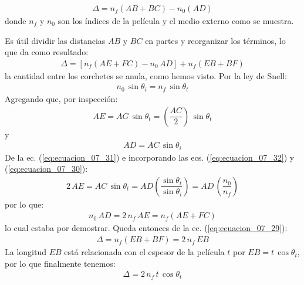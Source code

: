 \documentclass[14pt]{extarticle}
\begin{document}
\begin{align*}
\Delta = n_{f} (AB + BC) - n_{0} (AD)
\end{align*}
donde $n_{f}$ y $n_{0}$ son los índices de la película y el medio externo como se muestra.
\par
Es útil dividir las distancias $AB$ y $BC$ en partes y reorganizar los términos, lo que da como resultado:
\begin{align}
\Delta = \left[ n_{f} (AE + FC) - n_{0} \, AD\right] + n_{f} (EB + BF)
\label{eq:ecuacion_07_29}
\end{align}
la cantidad entre los corchetes se anula, como hemos visto. Por la ley de Snell:
\begin{align}
n_{0} \, \sin \theta_{i} = n_{f} \, \sin \theta_{t}
\label{eq:ecuacion_07_30}
\end{align}
Agregando que, por inspección:
\begin{align}
AE = AG \, \sin \theta_{t} = \left( \dfrac{AC}{2} \right) \, \sin \theta_{t}
\label{eq:ecuacion_07_31}
\end{align}
y
\begin{align}
AD = AC \, \sin \theta_{i}
\label{eq:ecuacion_07_32}
\end{align}
De la ec. (\ref{eq:ecuacion_07_31}) e incorporando las ecs. (\ref{eq:ecuacion_07_32}) y (\ref{eq:ecuacion_07_30}):
\begin{align*}
2 \, AE =  AC \, \sin \theta_{t} = AD \left( \dfrac{\sin \theta_{t}}{\sin \theta_{i}} \right) = AD \, \left( \dfrac{n_{0}}{n_{f}} \right)
\end{align*}
por lo que:
\begin{align}
n_{0} \, AD = 2 \, n_{f} \, AE = n_{f} (AE + FC)
\label{eq:ecuacion_07_33}
\end{align}
lo cual estaba por demostrar. Queda entonces de la ec. (\ref{eq:ecuacion_07_29}):
\begin{align}
\Delta = n_{f} (EB + BF) = 2 \, n_{f} \, EB
\label{eq:ecuacion_07_34}
\end{align}
La longitud $EB$ está relacionada con el espesor de la película $t$ por $EB = t \, \cos \theta_{t}$, por lo que finalmente tenemos:
\begin{align}
\Delta = 2 \, n_{f} \, t \, \cos \theta_{t}
\label{eq:ecuacion_07_35}
\end{align}
\end{document}
